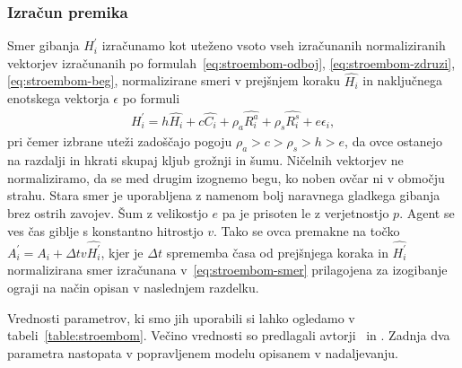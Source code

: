 \subsubsection{Izračun premika}

Smer gibanja $H_i^\prime$ izračunamo kot uteženo vsoto vseh izračunanih normaliziranih vektorjev izračunanih po formulah~\eqref{eq:stroembom-odboj}, \eqref{eq:stroembom-zdruzi}, \eqref{eq:stroembom-beg}, normalizirane smeri v prejšnjem koraku $\hat{H_{i}}$ in naključnega enotskega vektorja $\epsilon$ po formuli
\begin{align}
H_i^\prime = h\hat{H_{i}} + c\hat{C_i} + \rho_a\hat{R_i^a} + \rho_s\hat{R_i^s} + e\epsilon_i, \label{eq:stroembom-smer}
\end{align}
pri čemer izbrane uteži zadoščajo pogoju $\rho_a > c > \rho_s > h > e$, da ovce ostanejo na razdalji in hkrati skupaj kljub grožnji in šumu. Ničelnih vektorjev ne normaliziramo, da se med drugim izognemo begu, ko noben ovčar ni v območju strahu. Stara smer je uporabljena z namenom bolj naravnega gladkega gibanja brez ostrih zavojev. Šum z velikostjo $e$ pa je prisoten le z verjetnostjo $p$. Agent se ves čas giblje s konstantno hitrostjo $v$. Tako se ovca premakne na točko $A_i^\prime = A_i + \Delta t v\hat{H_i^\prime}$, kjer je $\Delta t$ sprememba časa od prejšnjega koraka in $\hat{H_i^\prime}$ normalizirana smer izračunana v~\eqref{eq:stroembom-smer} prilagojena za izogibanje ograji na način opisan v naslednjem razdelku.

Vrednosti parametrov, ki smo jih uporabili si lahko ogledamo v tabeli~\ref{table:stroembom}. Večino vrednosti so predlagali avtorji~\cite{Stroembom} in \cite{Demsar}. Zadnja dva parametra nastopata v popravljenem modelu opisanem v nadaljevanju.

